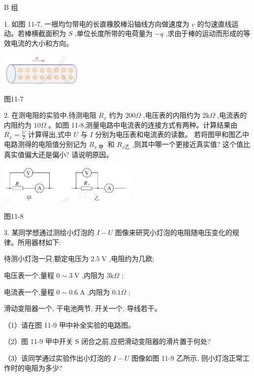 \documentclass[10pt]{article}
\begin{document}
B 组

1. 如图 11-7, 一根均匀带电的长直橡胶棒沿轴线方向做速度为 \(v\) 的匀速直线运动。若棒横截面积为 \(S\) ,单位长度所带的电荷量为 \(- q\) ,求由于棒的运动而形成的等效电流的大小和方向。

\begin{center}
\includegraphics[max width=0.3\textwidth]{images/01911d5f-8e38-70c0-b5b8-2b399bd115b6_81_165376.jpg}
\end{center}

图11-7

2. 在测电阻的实验中,待测电阻 \({R}_{x}\) 约为 \({200\Omega }\) ,电压表的内阻约为 \(2\mathrm{k}\Omega\) ,电流表的内阻约为 \({10\Omega }\) 。如图 11-8,测量电路中电流表的连接方式有两种。计算结果由 \({R}_{x} = \frac{U}{I}\) 计算得出,式中 \(U\) 与 \(I\) 分别为电压表和电流表的读数。 若将图甲和图乙中电路测得的电阻值分别记为 \({R}_{x\text{ 甲 }}\) 和 \({R}_{x乙}\) ,则其中哪一个更接近真实值? 这个值比真实值偏大还是偏小? 请说明原因。

\begin{center}
\includegraphics[max width=0.5\textwidth]{images/01911d5f-8e38-70c0-b5b8-2b399bd115b6_81_151295.jpg}
\end{center}

图11-8

3. 某同学想通过测绘小灯泡的 \(I - U\) 图像来研究小灯泡的电阻随电压变化的规律。所用器材如下:

待测小灯泡一只,额定电压为 \({2.5}\mathrm{\;V}\) ,电阻约为几欧;

电压表一个,量程 \(0 \sim 3\mathrm{\;V}\) ,内阻为 \(3\mathrm{k}\Omega\) ;

电流表一个,量程 \(0 \sim {0.6}\mathrm{\;A}\) ,内阻为 \({0.1\Omega }\) ;

滑动变阻器一个, 干电池两节, 开关一个, 导线若干。

（1）请在图 11-9 甲中补全实验的电路图。

（2）图 11-9 甲中开关 \(\mathrm{S}\) 闭合之前,应把滑动变阻器的滑片置于何处?

（3）该同学通过实验作出小灯泡的 \(I - U\) 图像如图 11-9 乙所示, 则小灯泡正常工作时的电阻为多少?
\end{document}
